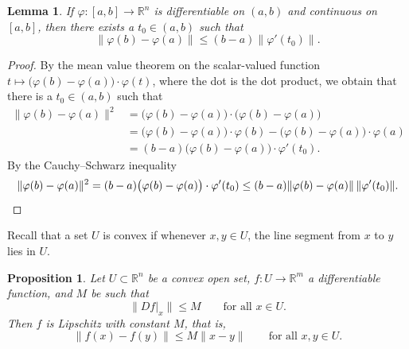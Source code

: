 \documentclass[12pt,openany]{book}
\newcommand{\snorm}[1]{\lVert {#1} \rVert}
\newcommand{\R}{{\mathbb{R}}}
\theoremstyle{plain}
\newtheorem{lemma}[thm]{Lemma}
\newtheorem{prop}[thm]{Proposition}
\theoremstyle{remark}
\theoremstyle{definition}
\theoremstyle{exercise}
\theoremstyle{example}
\begin{document}
\begin{lemma}
If $\varphi \colon [a,b] \to \R^n$ is differentiable on $(a,b)$ and
continuous on $[a,b]$, then there exists a $t_0 \in (a,b)$ such that
\begin{equation*}
\snorm{\varphi(b)-\varphi(a)} \leq (b-a) \snorm{\varphi'(t_0)} .
\end{equation*}
\end{lemma}

\begin{proof}
By the mean value theorem on the scalar-valued function
$t \mapsto \bigl(\varphi(b)-\varphi(a) \bigr) \cdot \varphi(t)$,
where the dot is the dot product, we obtain
that
there is a $t_0 \in (a,b)$ such that
\begin{equation*}
\begin{split}
\snorm{\varphi(b)-\varphi(a)}^2
& =
\bigl( \varphi(b)-\varphi(a) \bigr)
\cdot
\bigl( \varphi(b)-\varphi(a) \bigr)
\\
& =
\bigl(\varphi(b)-\varphi(a) \bigr) \cdot \varphi(b) - 
\bigl(\varphi(b)-\varphi(a) \bigr) \cdot \varphi(a)
\\
& = 
(b-a)
\bigl(\varphi(b)-\varphi(a) \bigr) \cdot \varphi'(t_0) .
\end{split}
\end{equation*}
By the Cauchy--Schwarz inequality
\begin{equation*}
\snorm{\varphi(b)-\varphi(a)}^2
=
(b-a)\bigl(\varphi(b)-\varphi(a) \bigr) \cdot \varphi'(t_0)
\leq
(b-a)
\snorm{\varphi(b)-\varphi(a)} \, \snorm{\varphi'(t_0)} . \qedhere
\end{equation*}
\end{proof}

Recall that a set $U$ is convex
if whenever $x,y \in U$, the line segment from
$x$ to $y$ lies in $U$.

\begin{prop} \label{mv:prop:convexlip}
Let $U \subset \R^n$ be a convex open set, $f \colon U \to \R^m$
a differentiable function, and $M$ be such that
\begin{equation*}
\snorm{Df|_x} \leq M
\qquad \text{for all } x \in U.
\end{equation*}
Then $f$ is Lipschitz with constant $M$, that is,
\begin{equation*}
\snorm{f(x)-f(y)} \leq M \snorm{x-y}
\qquad
\text{for all } x,y \in U.
\end{equation*}
\end{prop}
\end{document}
